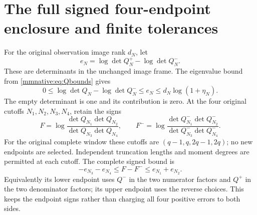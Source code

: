 \section{The full signed four-endpoint enclosure and finite tolerances}

For the original observation image rank $d_N$, let
\begin{equation}\label{mmnative:eq:deterror}
 e_N=\log\det Q_N^+-\log\det Q_N^-.
\end{equation}
These are determinants in the unchanged image frame.  The eigenvalue
bound from \eqref{mmnative:eq:Qbounds} gives
\begin{equation}\label{mmnative:eq:detcap}
 0\le\log\det Q_N-\log\det Q_N^-
 \le e_N\le d_N\log(1+\eta_N).
\end{equation}
The empty determinant is one and its contribution is zero.
At the four original cutoffs $N_1,N_2,N_3,N_4$, retain the signs
\[
 F=\log\frac{\det Q_{N_1}\det Q_{N_2}}
                    {\det Q_{N_3}\det Q_{N_4}},\qquad
 F^-=\log\frac{\det Q_{N_1}^-\det Q_{N_2}^-}
                     {\det Q_{N_3}^-\det Q_{N_4}^-}.
\]
For the original complete window these cutoffs are
$(q-1,q,2q-1,2q)$; no new endpoints are selected.  Independent
truncation lengths and moment degrees are permitted at each cutoff.
The complete signed bound is
\begin{equation}\label{mmnative:eq:four}
 \boxed{-e_{N_3}-e_{N_4}\le F-F^-
                       \le e_{N_1}+e_{N_2}.}
\end{equation}
Equivalently its lower endpoint uses $Q^-$ in the two numerator
factors and $Q^+$ in the two denominator factors; its upper endpoint
uses the reverse choices.  This keeps the endpoint signs rather than
charging all four positive errors to both sides.

